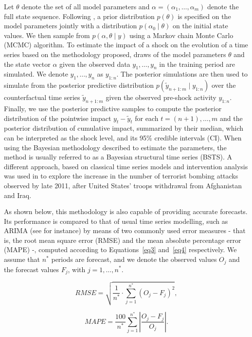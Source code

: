\documentclass[]{risa}
\begin{document}
Let $\theta$ denote the set of all model parameters and $\alpha = (\alpha_1, \ldots, \alpha_m)$ denote the full state sequence. Following \cite{brodersen_inferring_2015}, a prior distribution $p(\theta)$ is specified on the model parameters jointly with a distribution $p(\alpha_0 \mid \theta)$ on the initial state values. We then sample from $p(\alpha, \theta \mid y)$ using a Markov chain Monte Carlo (MCMC) algorithm. To estimate the impact of a shock on the evolution of a time series based on the methodology proposed, draws of the model parameters $\theta$ and the state vector $\alpha$ given the observed data $y_1, \ldots, y_n$ in the training period are simulated. We denote $y_1, \ldots, y_n$ as $y_{1:n}$. The posterior simulations are then used to simulate from the posterior predictive distribution $p(\tilde{y}_{n+1:m} \mid y_{1:n})$ over the counterfactual time series $\tilde{y}_{n+1:m}$ given the observed pre-shock activity $y_{1:n}$. Finally, we use the posterior predictive samples to compute the posterior distribution of the pointwise impact $y_t - \tilde{y}_t$ for each $t=(n+1), \ldots, m$ and the posterior distribution of cumulative impact, summarized by their median, which can be interpreted as the shock level, and its 95\% credible intervals (CI). When using the Bayesian methodology described to estimate the parameters, the method is usually referred to as a Bayesian structural time series (BSTS). A different approach, based on classical time series models and intervention analysis was used in \cite{li_dynamic_2017} to explore the increase in the number of terrorist bombing attacks observed by late 2011, after United States' troops withdrawal from Afghanistan and Iraq.


As shown below, this methodology is also capable of providing accurate forecasts. Its performance is compared to that of usual time series modelling, such as ARIMA (see for instance\cite{shumway_arima_2017}) by means of two commonly used error measures - that is, the root mean square error (RMSE) and the mean absolute percentage error (MAPE) -, computed according to Equations~\ref{eq3} and~\ref{eq4} respectively. We assume that $n^*$ periods are forecast, and we denote the observed values $O_j$ and the forecast values $F_j$, with $j=1,\dots, n^*$.

\begin{equation}\label{eq3}
RMSE=\sqrt{\frac{1}{n^*} \cdot \sum_{j=1}^{n^*} (O_j-F_j)^2},
\end{equation}

\begin{equation}\label{eq4}
MAPE=\frac{100}{n^*} \sum_{j=1}^{n^*} \left | \frac{O_j-F_j}{O_j} \right |.
\end{equation}
\end{document}
